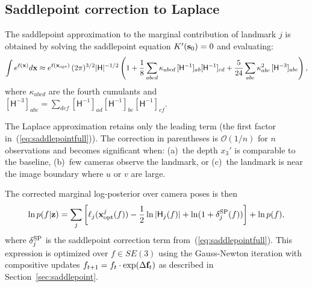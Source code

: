 \documentclass[journal]{IEEEtran}
\newcommand{\beq}{\begin{equation}}
\newcommand{\eeq}{\end{equation}}
\begin{document}
\subsection{Saddlepoint correction to Laplace}

The saddlepoint approximation to the marginal contribution of 
landmark $j$ is obtained by solving the saddlepoint equation 
$K'({\bf s}_0) = 0$ and evaluating:
\beq
    \int e^{\ell({\bf x})} d{\bf x} \approx 
    e^{\ell({\bf x}_{\rm opt})} \, (2\pi)^{3/2} |\mathsf{H}|^{-1/2}
    \left(1 + \frac{1}{8}\sum_{abcd} \kappa_{abcd}\, [\mathsf{H}^{-1}]_{ab}[\mathsf{H}^{-1}]_{cd}
    + \frac{5}{24}\sum_{abc} \kappa_{abc}^2 \, [\mathsf{H}^{-3}]_{abc}\right),
    \label{eq:saddlepointfull}
\eeq
where $\kappa_{abcd}$ are the fourth cumulants and 
$[\mathsf{H}^{-3}]_{abc} = \sum_{def} [\mathsf{H}^{-1}]_{ad}[\mathsf{H}^{-1}]_{be}[\mathsf{H}^{-1}]_{cf}$.

The Laplace approximation retains only the leading term 
(the first factor in~(\ref{eq:saddlepointfull})). The correction 
in parentheses is $\mathcal{O}(1/n)$ for $n$ observations 
and becomes significant when:
(a)~the depth $x_3'$ is comparable to the baseline,
(b)~few cameras observe the landmark, or
(c)~the landmark is near the image boundary where 
$u$ or $v$ are large.

The corrected marginal log-posterior over camera poses is then
\beq
    \ln p(f | {\bf z}) = \sum_j \left[\ell_j({\bf x}^j_{\rm opt}(f)) 
    - \frac{1}{2}\ln|\mathsf{H}_j(f)| + \ln(1 + \delta_j^{\rm SP}(f))\right]
    + \ln p(f),
    \label{eq:correctedmarginal}
\eeq
where $\delta_j^{\rm SP}$ is the saddlepoint correction term from~(\ref{eq:saddlepointfull}).
This expression is optimized over $f \in SE(3)$ using the Gauss-Newton iteration 
with compositive updates $f_{t+1} = f_t \cdot \exp(\Delta{\bf f}_t)$ as described 
in Section~\ref{sec:saddlepoint}.
\end{document}
